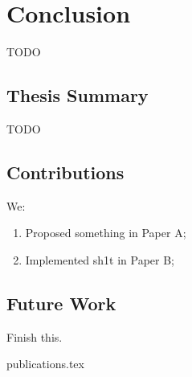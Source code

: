 \chapter{Conclusion}
\label{conclusion:chapter}

TODO

\section{Thesis Summary}

TODO

\section{Contributions}

We:

\begin{enumerate}
\item Proposed something in Paper A;
\item Implemented sh1t in Paper B;
\end{enumerate}

\section{Future Work}

Finish this.

{publications.tex}

